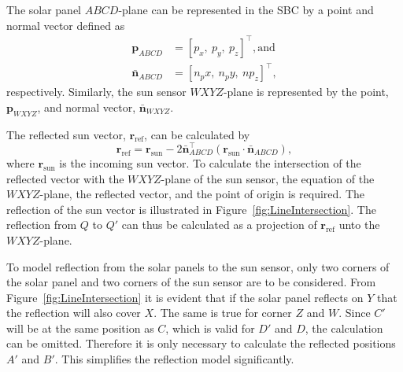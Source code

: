 The solar panel $ABCD$-plane can be represented in the SBC by a point and normal vector defined as
\begin{equation}
\begin{split}
\mathbf{p}_{ABCD} &= [p_x,~p_y,~p_z]^\top, \text{and}\\
\bar{\mathbf{n}}_{ABCD} &= [n_px,~n_py,~np_z]^\top,
\end{split}
\end{equation}
respectively.  Similarly, the sun sensor $WXYZ$-plane is represented by the point, $\mathbf{p}_{WXYZ}$, and normal vector, $\bar{\mathbf{n}}_{WXYZ}$.

The reflected sun vector, $\mathbf{r}_{\text{ref}}$, can be calculated by
\begin{equation}
\mathbf{r}_{\text{ref}} = \mathbf{r}_{\text{sun}} - 2\bar{\mathbf{n}}_{ABCD}^\top(\mathbf{r}_{\text{sun}} \cdot \bar{\mathbf{n}}_{ABCD}),
\end{equation}
where $\mathbf{r}_{\text{sun}}$ is the incoming sun vector.  To calculate the intersection of the reflected vector with the $WXYZ$-plane of the sun sensor, the equation of the $WXYZ$-plane, the reflected vector, and the point of origin is required. The reflection of the sun vector is illustrated in Figure~\ref{fig:LineIntersection}. The reflection from $Q$ to $Q'$ can thus be calculated as a projection of $\mathbf{r}_{\text{ref}}$ unto the $WXYZ$-plane.

To model reflection from the solar panels to the sun sensor, only two corners of the solar panel and two corners of the sun sensor are to be considered. From Figure~\ref{fig:LineIntersection} it is evident that if the solar panel reflects on $Y$ that the reflection will also cover $X$. The same is true for corner $Z$ and $W$. Since $C'$ will be at the same position as $C$, which is valid for $D'$ and $D$, the calculation can be omitted. Therefore it is only necessary to calculate the reflected positions $A'$ and $B'$. This simplifies the reflection model significantly.

